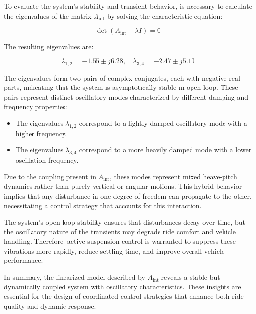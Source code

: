 \documentclass[]{report}
\begin{document}
	To evaluate the system's stability and transient behavior, is necessary to calculate the eigenvalues of the matrix \( A_{\text{int}} \) by solving the characteristic equation:
	
	
	\begin{equation}
		\det(A_{\text{int}} - \lambda I) = 0
	\end{equation}
	
	
	The resulting eigenvalues are:
	
	
	\begin{equation}
		\lambda_{1,2} = -1.55 \pm j6.28, \quad \lambda_{3,4} = -2.47 \pm j5.10
	\end{equation}
	
The eigenvalues form two pairs of complex conjugates, each with negative real parts, indicating that the system is asymptotically stable in open loop. These pairs represent distinct oscillatory modes characterized by different damping and frequency properties:

\begin{itemize}
	\item The eigenvalues \( \lambda_{1,2} \) correspond to a lightly damped oscillatory mode with a higher frequency.
	\item The eigenvalues \( \lambda_{3,4} \) correspond to a more heavily damped mode with a lower oscillation frequency.
\end{itemize}


	
	Due to the coupling present in \( A_{\text{int}} \), these modes represent mixed heave-pitch dynamics rather than purely vertical or angular motions. This hybrid behavior implies that any disturbance in one degree of freedom can propagate to the other, necessitating a control strategy that accounts for this interaction.
	
	The system’s open-loop stability ensures that disturbances decay over time, but the oscillatory nature of the transients may degrade ride comfort and vehicle handling. Therefore, active suspension control is warranted to suppress these vibrations more rapidly, reduce settling time, and improve overall vehicle performance.
	
	In summary, the linearized model described by \( A_{\text{int}} \) reveals a stable but dynamically coupled system with oscillatory characteristics. These insights are essential for the design of coordinated control strategies that enhance both ride quality and dynamic response.
	
	
	
\end{document}
